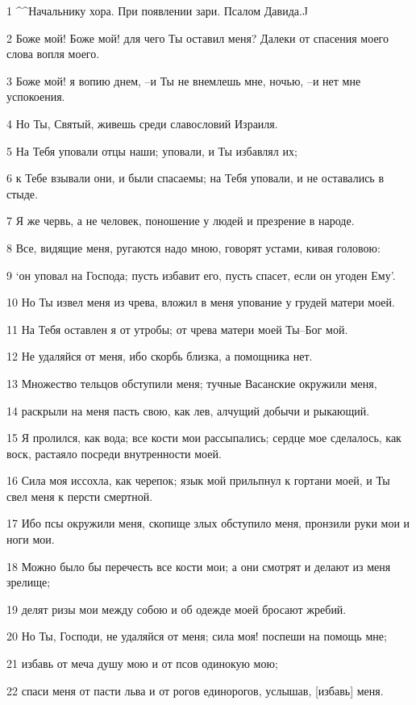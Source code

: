 \par 1 ^^Начальнику хора. При появлении зари. Псалом Давида.^^
\par 2 Боже мой! Боже мой! для чего Ты оставил меня? Далеки от спасения моего слова вопля моего.
\par 3 Боже мой! я вопию днем, --и Ты не внемлешь мне, ночью, --и нет мне успокоения.
\par 4 Но Ты, Святый, живешь среди славословий Израиля.
\par 5 На Тебя уповали отцы наши; уповали, и Ты избавлял их;
\par 6 к Тебе взывали они, и были спасаемы; на Тебя уповали, и не оставались в стыде.
\par 7 Я же червь, а не человек, поношение у людей и презрение в народе.
\par 8 Все, видящие меня, ругаются надо мною, говорят устами, кивая головою:
\par 9 `он уповал на Господа; пусть избавит его, пусть спасет, если он угоден Ему'.
\par 10 Но Ты извел меня из чрева, вложил в меня упование у грудей матери моей.
\par 11 На Тебя оставлен я от утробы; от чрева матери моей Ты--Бог мой.
\par 12 Не удаляйся от меня, ибо скорбь близка, а помощника нет.
\par 13 Множество тельцов обступили меня; тучные Васанские окружили меня,
\par 14 раскрыли на меня пасть свою, как лев, алчущий добычи и рыкающий.
\par 15 Я пролился, как вода; все кости мои рассыпались; сердце мое сделалось, как воск, растаяло посреди внутренности моей.
\par 16 Сила моя иссохла, как черепок; язык мой прильпнул к гортани моей, и Ты свел меня к персти смертной.
\par 17 Ибо псы окружили меня, скопище злых обступило меня, пронзили руки мои и ноги мои.
\par 18 Можно было бы перечесть все кости мои; а они смотрят и делают из меня зрелище;
\par 19 делят ризы мои между собою и об одежде моей бросают жребий.
\par 20 Но Ты, Господи, не удаляйся от меня; сила моя! поспеши на помощь мне;
\par 21 избавь от меча душу мою и от псов одинокую мою;
\par 22 спаси меня от пасти льва и от рогов единорогов, услышав, [избавь] меня.
